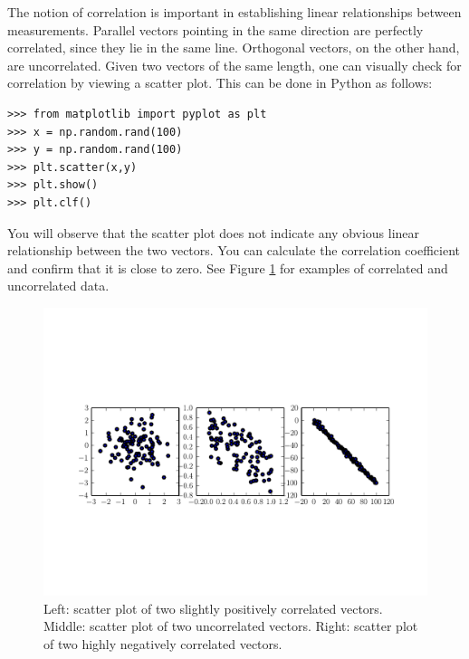 The notion of correlation is important in establishing linear relationships between measurements.
Parallel vectors pointing in the same direction are perfectly correlated, since they lie in the same line.
Orthogonal vectors, on the other hand, are uncorrelated.
Given two vectors of the same length, one can visually check for correlation by viewing a scatter plot.
This can be done in Python as follows:
\begin{lstlisting}
>>> from matplotlib import pyplot as plt
>>> x = np.random.rand(100)
>>> y = np.random.rand(100)
>>> plt.scatter(x,y)
>>> plt.show()
>>> plt.clf()
\end{lstlisting}
You will observe that the scatter plot does not indicate any obvious linear relationship between the two
vectors. You can calculate the correlation coefficient and confirm that it is close to zero.
See Figure \ref{fig:correlation} for examples of correlated and uncorrelated data.

\begin{figure}[h]
\includegraphics[width=\textwidth]{correlation}
\caption{Left: scatter plot of two slightly positively correlated vectors.
         Middle: scatter plot of two uncorrelated vectors.
         Right: scatter plot of two highly negatively correlated vectors.}
\label{fig:correlation}
\end{figure}

